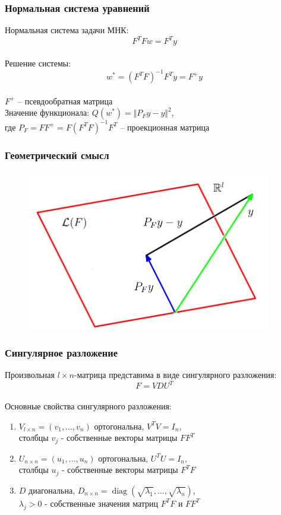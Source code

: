 \documentclass[12pt]{beamer}
\begin{document}
\begin{frame}\frametitle{Нормальная система уравнений}
Нормальная система задачи МНК:
$$F^TFw = F^Ty$$\\
Решение системы:\\
$$w^* = (F^TF)^{-1}F^Ty = F^+y$$\\
$F^+$ -- псевдообратная матрица\\
\vspace{5mm}
Значение функционала: $Q(w^*) = \Vert P_F y - y \Vert^2$,\\
где $P_F = FF^+ = F(F^TF)^{-1}F^T$ -- проекционная матрица
\end{frame}

\begin{frame}\frametitle{Геометрический смысл}
\begin{figure}[htbp]
  \includegraphics[height=200pt, keepaspectratio = true]{images/geometry}   
\end{figure}
\end{frame}

\begin{frame}\frametitle{Сингулярное разложение}
Произвольная $l \times n$-матрица представима в виде сингулярного разложения:\\
$$F = VDU^T$$\\
Основные свойства сингулярного разложения:\\
\begin{enumerate}[--]
\item $V_{l \times n} = (v_1, \dots, v_n)$ ортогональна, $V^TV = I_n$, \\столбцы $v_j$ - собственные векторы матрицы $FF^T$
\item $U_{n \times n} = (u_1, \dots, u_n)$ ортогональна, $U^TU = I_n$, \\столбцы $u_j$ - собственные векторы матрицы $F^TF$
\item $D$ диагональна, $D_{n \times n} = \operatorname{diag} (\sqrt{\lambda_1}, \dots, \sqrt{\lambda_n})$, \\$\lambda_j > 0$ - собственные значения матриц $F^TF$ и $FF^T$
\end{enumerate}
\end{frame}
\end{document}
